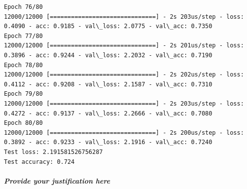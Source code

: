 \documentclass[11pt]{article}
\begin{document}
\begin{Verbatim}[commandchars=\\\{\}]
Epoch 76/80
12000/12000 [==============================] - 2s 203us/step - loss: 0.4090 - acc: 0.9185 - val\_loss: 2.0775 - val\_acc: 0.7350
Epoch 77/80
12000/12000 [==============================] - 2s 201us/step - loss: 0.3896 - acc: 0.9244 - val\_loss: 2.2032 - val\_acc: 0.7190
Epoch 78/80
12000/12000 [==============================] - 2s 202us/step - loss: 0.4112 - acc: 0.9208 - val\_loss: 2.1587 - val\_acc: 0.7310
Epoch 79/80
12000/12000 [==============================] - 2s 203us/step - loss: 0.4272 - acc: 0.9137 - val\_loss: 2.2666 - val\_acc: 0.7080
Epoch 80/80
12000/12000 [==============================] - 2s 200us/step - loss: 0.3892 - acc: 0.9233 - val\_loss: 2.1916 - val\_acc: 0.7240
Test loss: 2.191581526756287
Test accuracy: 0.724

    \end{Verbatim}

    \hypertarget{provide-your-justification-here}{%
\subparagraph{Provide your justification
here}\label{provide-your-justification-here}}


    
    
    
    
\end{document}
